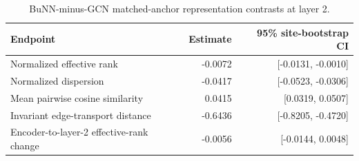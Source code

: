 \begin{table}[!t]
\centering
\caption{BuNN-minus-GCN matched-anchor representation contrasts at layer 2.}
\label{tab:representation}
\footnotesize
\begin{tabularx}{\textwidth}{Xrr}
\toprule
Endpoint & Estimate & 95\% site-bootstrap CI \\
\midrule
Normalized effective rank & -0.0072 & [-0.0131, -0.0010] \\
Normalized dispersion & -0.0417 & [-0.0523, -0.0306] \\
Mean pairwise cosine similarity & 0.0415 & [0.0319, 0.0507] \\
Invariant edge-transport distance & -0.6436 & [-0.8205, -0.4720] \\
Encoder-to-layer-2 effective-rank change & -0.0056 & [-0.0144, 0.0048] \\
\bottomrule
\end{tabularx}
\end{table}
